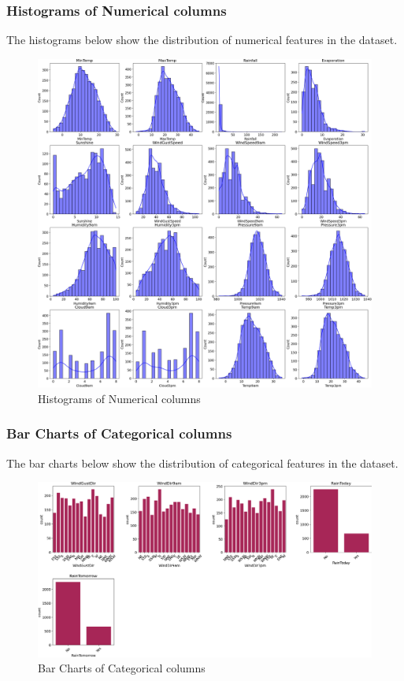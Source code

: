 \documentclass{article}%
\begin{document}
\subsubsection{Histograms of Numerical columns}%
\label{ssubsec:HistogramsofNumericalcolumns}%
The histograms below show the distribution of numerical features in the dataset.%


\begin{figure}[h!]%
\centering%
\includegraphics[width=460px]{EDA/histograms.png}%
\caption{Histograms of Numerical columns}%
\end{figure}

%
\newpage%
\subsubsection{Bar Charts of Categorical columns}%
\label{ssubsec:BarChartsofCategoricalcolumns}%
The bar charts below show the distribution of categorical features in the dataset.%


\begin{figure}[h!]%
\centering%
\includegraphics[width=460px]{EDA/bar_charts.png}%
\caption{Bar Charts of Categorical columns}%
\end{figure}
\end{document}
